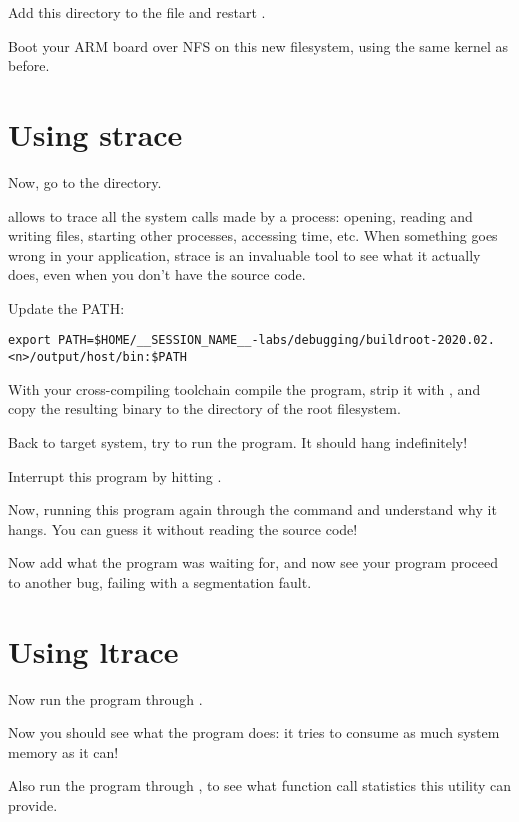 Add this directory to the  file and restart
.

Boot your ARM board over NFS on this new filesystem, using the same
kernel as before.

\section{Using strace}

Now, go to the  directory.

 allows to trace all the system calls made by a process:
opening, reading and writing files, starting other processes,
accessing time, etc. When something goes wrong in your application,
strace is an invaluable tool to see what it actually does, even when
you don't have the source code.


Update the PATH:
\footnotesize
\begin{verbatim}
export PATH=$HOME/__SESSION_NAME__-labs/debugging/buildroot-2020.02.<n>/output/host/bin:$PATH
\end{verbatim}
\normalsize

With your cross-compiling toolchain
compile the  program, strip it with
, and copy the resulting binary to the
 directory of the root filesystem.

Back to target system, try to run the 
program. It should hang indefinitely!

Interrupt this program by hitting \code{[Ctrl] [C]}.

Now, running this program again through the  command and
understand why it hangs. You can guess it without reading the source
code!

Now add what the program was waiting for, and now see your program
proceed to another bug, failing with a segmentation fault.

\section{Using ltrace}

Now run the program through .

Now you should see what the program does: it tries to consume as much
system memory as it can!

Also run the program through , to see what function call
statistics this utility can provide.

